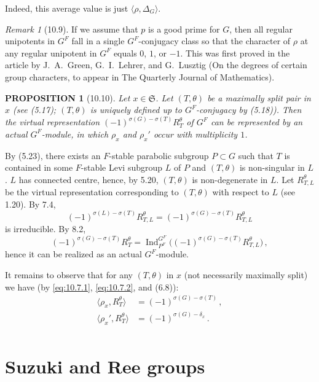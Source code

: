 \documentclass{amsart}
\theoremstyle{plain}
\newtheorem{proposition}[theorem]{PROPOSITION}
\theoremstyle{remark}
\newtheorem{remark}[theorem]{Remark}
\DeclareMathOperator{\Ind}{Ind}
\begin{document}
Indeed, this average value is just $\langle \rho, \Delta_G \rangle$.

\begin{remark}[10.9]
If we assume that $p$ is a good prime for $G$, then all regular unipotents in $G^F$ fall in a single $G^F$-conjugacy class so that the character of $\rho$ at any regular unipotent in $G^F$ equals $0$, $1$, or $-1$. This was first proved in the article by J.~A.~Green, G.~I.~Lehrer, and G.~Lusztig (On the degrees of certain group characters, to appear in The Quarterly Journal of Mathematics).
\end{remark}

\begin{proposition}[10.10]
Let $x \in \mathfrak{S}$. Let $(T, \theta)$ be a maximally split pair in $x$ (see (5.17); $(T, \theta)$ is uniquely defined up to $G^F$-conjugacy by (5.18)). Then the virtual representation $(-1)^{\sigma(G) - \sigma(T)} R_T^\theta$ of $G^F$ can be represented by an actual $G^F$-module, in which $\rho_x$ and $\rho_x'$ occur with multiplicity $1$.
\end{proposition}

By (5.23), there exists an $F$-stable parabolic subgroup $P \subset G$ such that $T$ is contained in some $F$-stable Levi subgroup $L$ of $P$ and $(T, \theta)$ is non-singular in $L$. $L$ has connected centre, hence, by 5.20, $(T, \theta)$ is non-degenerate in $L$. Let $R_{T,L}^\theta$ be the virtual representation corresponding to $(T, \theta)$ with respect to $L$ (see 1.20). By 7.4,
\[
(-1)^{\sigma(L) - \sigma(T)} R_{T,L}^\theta = (-1)^{\sigma(G) - \sigma(T)} R_{T,L}^\theta
\]
is irreducible. By 8.2,
\[
(-1)^{\sigma(G) - \sigma(T)} R_T^\theta = \Ind_{P^F}^{G^F}\bigl((-1)^{\sigma(G) - \sigma(T)} R_{T,L}^\theta\bigr)\,,
\]
hence it can be realized as an actual $G^F$-module.

It remains to observe that for any $(T, \theta)$ in $x$ (not necessarily maximally split) we have (by \eqref{eq:10.7.1}, \eqref{eq:10.7.2}, and (6.8)):
\begin{align*}
\langle \rho_x, R_T^\theta \rangle &= (-1)^{\sigma(G) - \sigma(T)}\,,\\
\langle \rho_x', R_T^\theta \rangle &= (-1)^{\sigma(G) - \delta_x}\,.\\
\end{align*}

\section{Suzuki and Ree groups}
\end{document}
